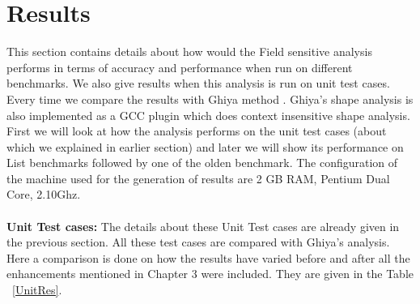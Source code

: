 \section{Results}

This section contains details about how would the Field sensitive analysis 
performs in terms of accuracy and performance when run on different benchmarks.
We also give results when this analysis is run on unit test cases. Every time we compare
the results with Ghiya method \cite{Ghiya96}. Ghiya's shape analysis is also
implemented as a GCC plugin which does context insensitive shape analysis.
First we will look at how the analysis performs on the unit test cases (about which we explained in earlier section)
and later we will show its performance on List benchmarks followed by one of the olden benchmark. The configuration of the machine used for
the generation of results are 2 GB RAM, Pentium Dual Core, 2.10Ghz. \\ \\
\textbf{Unit Test cases: }The details about these Unit Test cases are already given in the previous section.
All these test cases are compared with Ghiya's analysis.
Here  a comparison is done on how the results have varied before and after all the enhancements 
mentioned in Chapter 3 were included. They are given in the Table ~\ref{UnitRes}.

